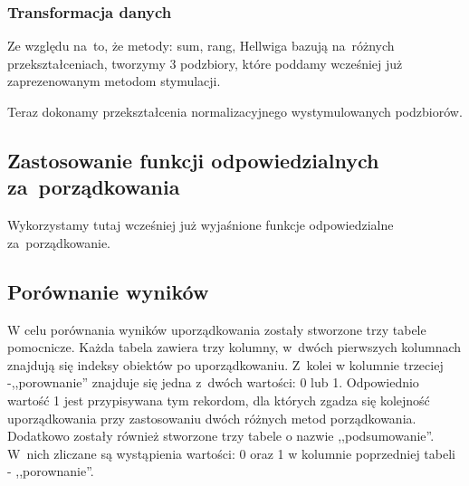 \documentclass[12pt,a4paper]{report}
\begin{document}
{\subsubsection{Transformacja danych}
Ze względu na~to, że metody: sum, rang, Hellwiga bazują na~różnych przekształceniach, tworzymy 3 podzbiory, które poddamy wcześniej już zaprezenowanym metodom stymulacji. 
\begin{Shaded}
\begin{Highlighting}[]
\NormalTok{)}
\NormalTok{)}
\NormalTok{)}
\end{Highlighting}
\end{Shaded}
Teraz dokonamy przekształcenia normalizacyjnego wystymulowanych
podzbiorów.
\begin{Shaded}
\begin{Highlighting}[]
\end{Highlighting}
\end{Shaded}

\subsection{Zastosowanie funkcji odpowiedzialnych za~porządkowania}
Wykorzystamy tutaj wcześniej już wyjaśnione funkcje odpowiedzialne za~porządkowanie. 

\begin{Shaded}
\begin{Highlighting}[]
\end{Highlighting}
\end{Shaded}
\subsection{Porównanie wyników}\label{porownanie-3metody}
W celu porównania wyników uporządkowania zostały stworzone trzy tabele
pomocnicze. Każda tabela zawiera trzy kolumny, w~dwóch pierwszych
kolumnach znajdują się indeksy obiektów po uporządkowaniu. Z~kolei w
kolumnie trzeciej -,,porownanie'' znajduje się jedna z~dwóch wartości: 0
lub 1. Odpowiednio wartość 1 jest przypisywana tym rekordom, dla których
zgadza się kolejność uporządkowania przy zastosowaniu dwóch różnych
metod porządkowania. Dodatkowo zostały również stworzone trzy tabele o
nazwie ,,podsumowanie''. W~nich zliczane są wystąpienia wartości: 0 oraz 1 
w kolumnie poprzedniej tabeli - ,,porownanie''.
}
\end{document}
